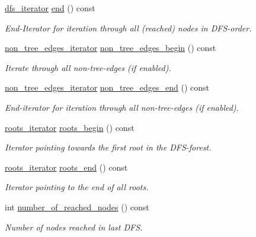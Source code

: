 \begin{DoxyCompactItemize}
\mbox{\hyperlink{classdfs_a15fe023a5a1f7ddda00f3d87110d9a32}{dfs\+\_\+iterator}} \mbox{\hyperlink{classdfs_af847633fa642258d3522e8deb26aef37}{end}} () const
\begin{DoxyCompactList}\small\item\em End-\/\+Iterator for iteration through all (reached) nodes in D\+F\+S-\/order. \end{DoxyCompactList}\item 
\mbox{\hyperlink{classdfs_a95e353f354d3b31daded0c4fe749171a}{non\+\_\+tree\+\_\+edges\+\_\+iterator}} \mbox{\hyperlink{classdfs_a4efe5bb72d00305e6b226e67c2b2ef6e}{non\+\_\+tree\+\_\+edges\+\_\+begin}} () const
\begin{DoxyCompactList}\small\item\em Iterate through all non-\/tree-\/edges (if enabled). \end{DoxyCompactList}\item 
\mbox{\hyperlink{classdfs_a95e353f354d3b31daded0c4fe749171a}{non\+\_\+tree\+\_\+edges\+\_\+iterator}} \mbox{\hyperlink{classdfs_ad9cd92a18bda23edca8ab3ac60a15ef4}{non\+\_\+tree\+\_\+edges\+\_\+end}} () const
\begin{DoxyCompactList}\small\item\em End-\/iterator for iteration through all non-\/tree-\/edges (if enabled). \end{DoxyCompactList}\item 
\mbox{\hyperlink{classdfs_a1ea6e8eb2766ac95ac48a8523359065a}{roots\+\_\+iterator}} \mbox{\hyperlink{classdfs_af56fa2b736f0b924dba1257e18ba4b61}{roots\+\_\+begin}} () const
\begin{DoxyCompactList}\small\item\em Iterator pointing towards the first root in the D\+F\+S-\/forest. \end{DoxyCompactList}\item 
\mbox{\hyperlink{classdfs_a1ea6e8eb2766ac95ac48a8523359065a}{roots\+\_\+iterator}} \mbox{\hyperlink{classdfs_ae1a61d8c2d8d99059cab410f766ec73f}{roots\+\_\+end}} () const
\begin{DoxyCompactList}\small\item\em Iterator pointing to the end of all roots. \end{DoxyCompactList}\item 
int \mbox{\hyperlink{classdfs_ae8849a552721ad4af5d9a81c6da35822}{number\+\_\+of\+\_\+reached\+\_\+nodes}} () const
\begin{DoxyCompactList}\small\item\em Number of nodes reached in last D\+FS. \end{DoxyCompactList}\end{DoxyCompactItemize}
